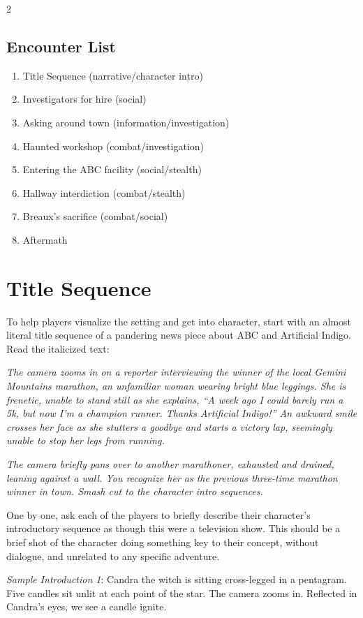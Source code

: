 \documentclass{book}
\newcommand{\ai}{{\color{cyan}Artificial Indigo}\xspace}
\begin{document}
\begin{multicols*}{2}
\subsection{Encounter List}
\begin{enumerate}
    \setlength\itemsep{-.5em}
    \item Title Sequence (narrative/character intro)
    \item Investigators for hire (social)
    \item Asking around town (information/investigation)
    \item Haunted workshop (combat/investigation)
    \item Entering the ABC facility (social/stealth)
    \item Hallway interdiction (combat/stealth)
    \item Breaux's sacrifice (combat/social)
    \item Aftermath
\end{enumerate}

\section{Title Sequence}

To help players visualize the setting and get into character, start with an almost literal title sequence of a pandering news piece about ABC and \ai.  Read the italicized text:

\emph{The camera zooms in on a reporter interviewing the winner of the local Gemini Mountains marathon, an unfamiliar woman wearing bright blue leggings.  She is frenetic, unable to stand still as she explains, ``A week ago I could barely run a 5k, but now I'm a champion runner.  Thanks \ai!''  An awkward smile crosses her face as she stutters a goodbye and starts a victory lap, seemingly unable to stop her legs from running.}

\emph{The camera briefly pans over to another marathoner, exhausted and drained, leaning against a wall.  You recognize her as the previous three-time marathon winner in town.  Smash cut to the character intro sequences.}

One by one, ask each of the players to briefly describe their character's introductory sequence as though this were a television show.  This should be a brief shot of the character doing something key to their concept, without dialogue, and unrelated to any specific adventure.

\emph{Sample Introduction 1}: Candra the witch is sitting cross-legged in a pentagram.  Five candles sit unlit at each point of the star.  The camera zooms in.  Reflected in Candra's eyes, we see a candle ignite.


\end{multicols*}
\end{document}
